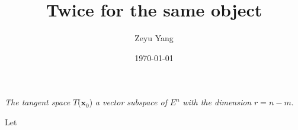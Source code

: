 \documentclass[titlepage,a4paper,12pt]{article}
\theoremstyle{nonumberplain}
\newtheorem{Proof}{\hskip 2em Proof}
\begin{document}
    \title{\textbf{Twice for the same object}}
    \author{Zeyu Yang}
    \date{\today}
    \maketitle

    \emph{The tangent space} $T$($\textbf{x}_0$) \emph{a vector subspace of} $E^n$ \emph{with the dimension} $r=n-m$.
\begin{Proof}
Let
\end{Proof}
\end{document}
